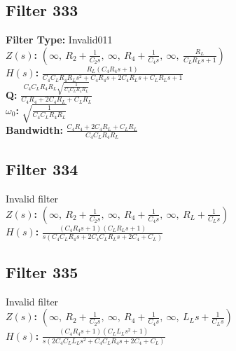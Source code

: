 \documentclass{article}
\begin{document}
\subsection*{Filter 333}
\textbf{Filter Type:} Invalid011 \\ 
\textbf{$Z(s)$:} $\left( \infty, \  R_{2} + \frac{1}{C_{2} s}, \  \infty, \  R_{4} + \frac{1}{C_{4} s}, \  \infty, \  \frac{R_{L}}{C_{L} R_{L} s + 1}\right)$ \\ 
\textbf{$H(s)$:} $\frac{R_{L} \left(C_{4} R_{4} s + 1\right)}{C_{4} C_{L} R_{4} R_{L} s^{2} + C_{4} R_{4} s + 2 C_{4} R_{L} s + C_{L} R_{L} s + 1}$ \\ 
\textbf{Q:} $\frac{C_{4} C_{L} R_{4} R_{L} \sqrt{\frac{1}{C_{4} C_{L} R_{4} R_{L}}}}{C_{4} R_{4} + 2 C_{4} R_{L} + C_{L} R_{L}}$ \\ 
\textbf{$\omega_0$:} $\sqrt{\frac{1}{C_{4} C_{L} R_{4} R_{L}}}$ \\ 
\textbf{Bandwidth:} $\frac{C_{4} R_{4} + 2 C_{4} R_{L} + C_{L} R_{L}}{C_{4} C_{L} R_{4} R_{L}}$ \\ 
\subsection*{Filter 334}
Invalid filter \\ 
\textbf{$Z(s)$:} $\left( \infty, \  R_{2} + \frac{1}{C_{2} s}, \  \infty, \  R_{4} + \frac{1}{C_{4} s}, \  \infty, \  R_{L} + \frac{1}{C_{L} s}\right)$ \\ 
\textbf{$H(s)$:} $\frac{\left(C_{4} R_{4} s + 1\right) \left(C_{L} R_{L} s + 1\right)}{s \left(C_{4} C_{L} R_{4} s + 2 C_{4} C_{L} R_{L} s + 2 C_{4} + C_{L}\right)}$ \\ 
\subsection*{Filter 335}
Invalid filter \\ 
\textbf{$Z(s)$:} $\left( \infty, \  R_{2} + \frac{1}{C_{2} s}, \  \infty, \  R_{4} + \frac{1}{C_{4} s}, \  \infty, \  L_{L} s + \frac{1}{C_{L} s}\right)$ \\ 
\textbf{$H(s)$:} $\frac{\left(C_{4} R_{4} s + 1\right) \left(C_{L} L_{L} s^{2} + 1\right)}{s \left(2 C_{4} C_{L} L_{L} s^{2} + C_{4} C_{L} R_{4} s + 2 C_{4} + C_{L}\right)}$ \\ 
\end{document}
